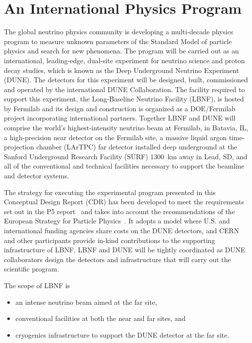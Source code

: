 
\section{An International Physics Program}

The global neutrino physics community is developing a multi-decade
physics program to measure unknown parameters of the Standard Model of
particle physics and search for new phenomena.  The program will be carried out as an international,
leading-edge, dual-site experiment for neutrino science and proton decay studies, which 
is known as the Deep Underground Neutrino Experiment (DUNE).
The detectors for this experiment will be designed, built, commissioned and operated by the international DUNE Collaboration. The facility required to support this experiment, the Long-Baseline Neutrino Facility (LBNF), is hosted by Fermilab and its design and construction is organized as a DOE/Fermilab project incorporating international partners. Together LBNF and DUNE will comprise the world's highest-intensity neutrino beam at Fermilab, in Batavia, IL, a high-precision near detector on the Fermilab site, a massive liquid argon time-projection chamber (LArTPC) far detector installed deep underground at the Sanford Underground Research Facility (SURF) \SI{1300}{\km} away in Lead, SD, and all of the conventional and technical facilities necessary to support the beamline and detector systems. 


The strategy for executing the experimental program presented in this Conceptual 
Design Report (CDR) has been developed to meet the requirements 
set out in the P5 report~\cite{p5report} and takes into account the recommendations of the European Strategy for Particle Physics~\cite{ESPP-2012}. It adopts a model where U.S. and international funding agencies 
share costs on the DUNE detectors, and CERN and other participants provide in-kind contributions 
to the supporting infrastructure of LBNF. LBNF and DUNE will be tightly coordinated as DUNE collaborators 
design the detectors and infrastructure that will carry out the scientific program.
  
The scope of LBNF is
\begin{itemize}
\item an intense neutrino beam aimed at the far site,
\item conventional facilities at both the near and far sites, and
\item cryogenics infrastructure to support the DUNE detector at the far site.
\end{itemize}

